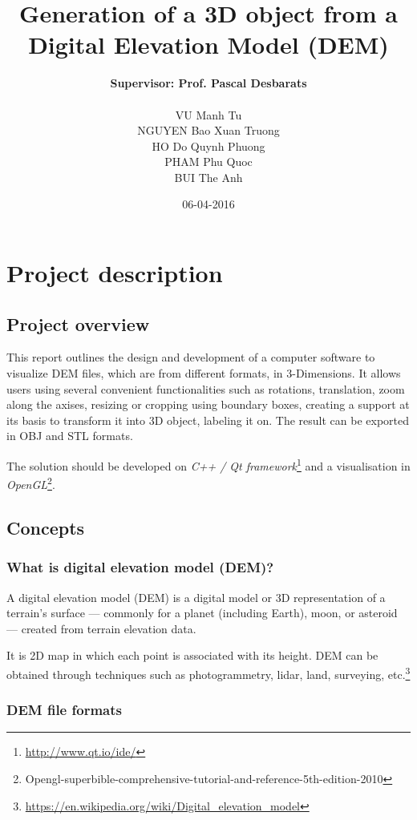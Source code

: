 \documentclass[11pt]{article}
\title{\textbf{Generation of a 3D object from a Digital Elevation Model (DEM)}}
\author{\textbf{Supervisor: Prof. Pascal Desbarats}\\\\
		VU Manh Tu\\
		NGUYEN Bao Xuan Truong\\
		HO Do Quynh Phuong\\
		PHAM Phu Quoc\\
		BUI The Anh		
		}
\date{06-04-2016}
\begin{document}
\maketitle
\section{Project description}
\subsection{Project overview}
This report outlines the design and development of a computer software to visualize DEM files, which are from different formats, in 3-Dimensions. It allows users using several convenient functionalities such as rotations, translation, zoom along the axises, resizing or cropping using boundary boxes, creating a support at its basis to transform it into 3D object, labeling it on. The result can be exported in OBJ and STL formats. 

The solution should be developed on \emph{C++ / Qt framework}\footnote{\url{http://www.qt.io/ide/}} and a visualisation in \emph{OpenGL}\footnote{Opengl-superbible-comprehensive-tutorial-and-reference-5th-edition-2010}.

\subsection{Concepts}
\subsubsection{What is digital elevation model (DEM)?}
A digital elevation model (DEM) is a digital model or 3D representation of a terrain's surface — commonly for a planet (including Earth), moon, or asteroid — created from terrain elevation data.
\par\noindent It is 2D map in which each point is associated with its height. DEM can be obtained through techniques such as photogrammetry, lidar, land, surveying, etc.\footnote{\url{https://en.wikipedia.org/wiki/Digital_elevation_model}}


\subsubsection{DEM file formats}
\end{document}
